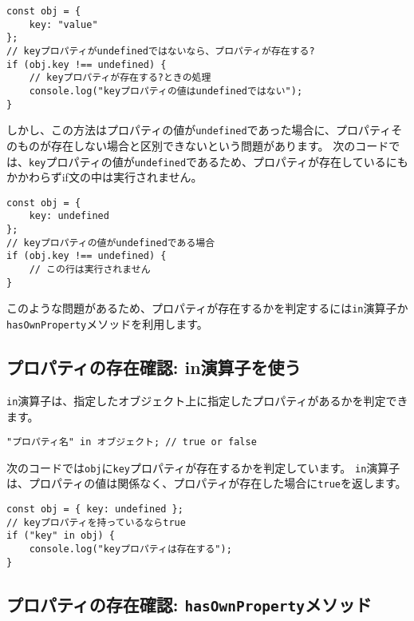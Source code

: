 \begin{lstlisting}
const obj = {
    key: "value"
};
// keyプロパティがundefinedではないなら、プロパティが存在する?
if (obj.key !== undefined) {
    // keyプロパティが存在する?ときの処理
    console.log("keyプロパティの値はundefinedではない");
}
\end{lstlisting}

しかし、この方法はプロパティの値が\texttt{undefined}であった場合に、プロパティそのものが存在しない場合と区別できないという問題があります。
次のコードでは、\texttt{key}プロパティの値が\texttt{undefined}であるため、プロパティが存在しているにもかかわらずif文の中は実行されません。

\begin{lstlisting}
const obj = {
    key: undefined
};
// keyプロパティの値がundefinedである場合
if (obj.key !== undefined) {
    // この行は実行されません
}
\end{lstlisting}

このような問題があるため、プロパティが存在するかを判定するには\texttt{in}演算子か\texttt{hasOwnProperty}メソッドを利用します。

\hypertarget{in-operator}{%
\subsection{プロパティの存在確認: in演算子を使う}\label{in-operator}}

\texttt{in}演算子は、指定したオブジェクト上に指定したプロパティがあるかを判定できます。

\begin{lstlisting}
"プロパティ名" in オブジェクト; // true or false
\end{lstlisting}

次のコードでは\texttt{obj}に\texttt{key}プロパティが存在するかを判定しています。
\texttt{in}演算子は、プロパティの値は関係なく、プロパティが存在した場合に\texttt{true}を返します。

\begin{lstlisting}
const obj = { key: undefined };
// keyプロパティを持っているならtrue
if ("key" in obj) {
    console.log("keyプロパティは存在する");
}
\end{lstlisting}

\hypertarget{hasOwnProperty-method}{%
\subsection{\texorpdfstring{プロパティの存在確認:
\texttt{hasOwnProperty}メソッド}{プロパティの存在確認: hasOwnPropertyメソッド}}\label{hasOwnProperty-method}}

